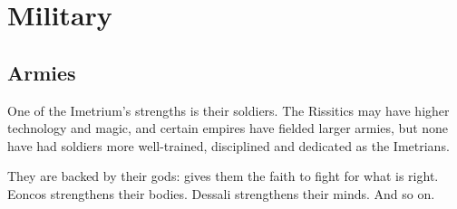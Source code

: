 \section{Military}





\subsection{Armies}
One of the Imetrium's strengths is their soldiers. 
The Rissitics may have higher technology and magic, and certain empires have fielded larger armies, but none have had soldiers more well-trained, disciplined and dedicated as the Imetrians. 

They are backed by their gods: 
\Sarokash gives them the faith to fight for what is right. 
Eoncos strengthens their bodies. 
Dessali strengthens their minds. 
And so on. 





